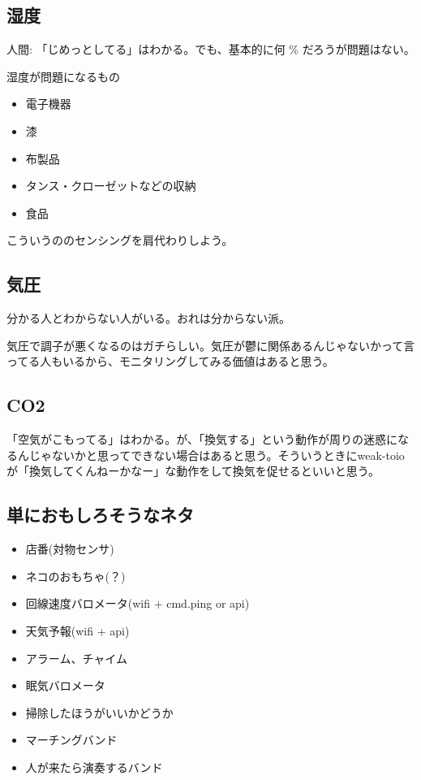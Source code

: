 \documentclass[fleqn,twocolumn]{mynote}
\begin{document}
\subsection*{湿度}
人間: 「じめっとしてる」はわかる。でも、基本的に何 \% だろうが問題はない。

湿度が問題になるもの
\begin{itemize}
  \item 電子機器
  \item 漆
  \item 布製品
  \item タンス・クローゼットなどの収納
  \item 食品
\end{itemize}

こういうののセンシングを肩代わりしよう。

\subsection*{気圧}
分かる人とわからない人がいる。おれは分からない派。

気圧で調子が悪くなるのはガチらしい。気圧が鬱に関係あるんじゃないかって言ってる人もいるから、モニタリングしてみる価値はあると思う。

\subsection*{CO2}
「空気がこもってる」はわかる。が、「換気する」という動作が周りの迷惑になるんじゃないかと思ってできない場合はあると思う。そういうときにweak-toioが「換気してくんねーかなー」な動作をして換気を促せるといいと思う。

\subsection*{単におもしろそうなネタ}
\begin{itemize}
  \item 店番(対物センサ)
  \item ネコのおもちゃ(？)
  \item 回線速度バロメータ(wifi + cmd.ping or api)
  \item 天気予報(wifi + api)
  \item アラーム、チャイム
  \item 眠気バロメータ
  \item 掃除したほうがいいかどうか
  \item マーチングバンド
  \item 人が来たら演奏するバンド
\end{itemize}
\end{document}
